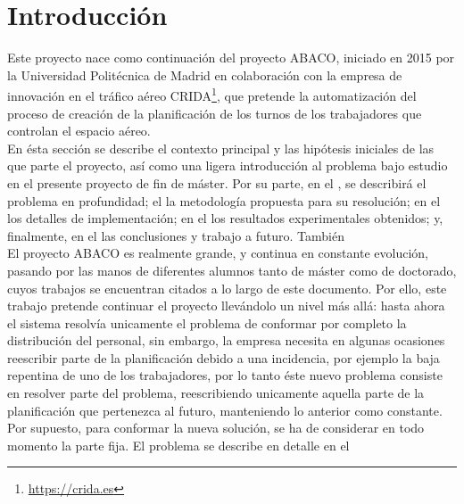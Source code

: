 \graphicspath{{capitulos/Capitulo1-Introduccion/recursos/}}


\section{Introducción}

Este proyecto nace como continuación del proyecto ABACO, iniciado en 2015 por la Universidad Politécnica de Madrid en
colaboración con la empresa de innovación en el tráfico aéreo CRIDA\footnote{\url{https://crida.es}}, que pretende la
automatización del proceso de creación de la planificación de los turnos de los trabajadores que controlan el espacio aéreo.
\\

En ésta sección se describe el contexto principal y las hipótesis iniciales de las que parte el proyecto, así como una
ligera introducción al problema bajo estudio en el presente proyecto de fin de máster. Por su parte, en el
, se describirá el problema en profundidad; el 
la metodología propuesta para su resolución; en el  los detalles de implementación;
en el  los resultados experimentales obtenidos; y, finalmente, en el
 las conclusiones y trabajo a futuro. También  %
\\

El proyecto ABACO es realmente grande, y continua en constante evolución, pasando por las manos de diferentes alumnos
tanto de máster como de doctorado, cuyos trabajos se encuentran citados a lo largo de este documento. Por ello, este
trabajo pretende continuar el proyecto llevándolo un nivel más allá: hasta ahora el sistema resolvía unicamente el
problema de conformar por completo la distribución del personal, sin embargo, la empresa necesita en algunas ocasiones
reescribir parte de la planificación debido a una incidencia, por ejemplo la baja repentina de uno de los trabajadores,
por lo tanto éste nuevo problema consiste en resolver parte del problema, reescribiendo unicamente aquella parte de la
planificación que pertenezca al futuro, manteniendo lo anterior como constante. Por supuesto, para conformar la nueva
solución, se ha de considerar en todo momento la parte fija. El problema se describe en detalle en el 
\\

